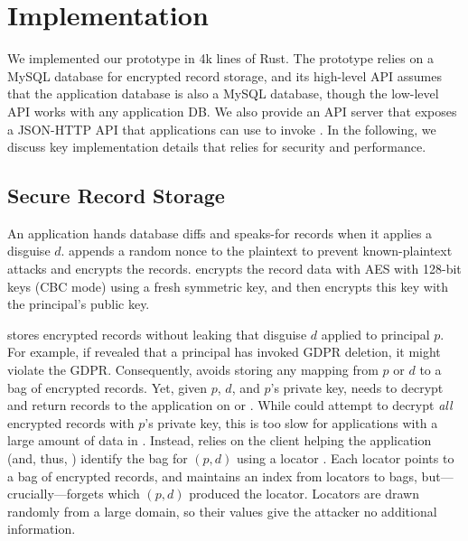 \section{Implementation}
\label{s:impl}

%
We implemented our \sys prototype in 4k lines of Rust.
%
The prototype relies on a MySQL database for encrypted record storage, and
its high-level API assumes that the application database is also a MySQL
database, though the low-level API works with any application DB.
%
We also provide an API server that exposes a JSON-HTTP API that applications
can use to invoke \sys.
%
In the following, we discuss key implementation details that \sys relies for
security and performance.
%

\subsection{Secure Record Storage}
\label{s:impl-locators}
%
An application hands \sys database diffs and speaks-for records when it applies
a disguise $d$.
%
\sys appends a random nonce to the plaintext to prevent known-plaintext attacks
and encrypts the records.
%
\sys encrypts the record data with AES with 128-bit keys (CBC mode) using a fresh symmetric key, and
then encrypts this key with the principal's public key.
%

%
\sys stores encrypted records without leaking that disguise $d$ applied to
principal $p$.
%
For example, if \sys revealed that a principal has invoked GDPR deletion, it
might violate the GDPR.
%
Consequently, \sys avoids storing any mapping from $p$ or $d$ to a bag of
encrypted records.
%
Yet, given $p$, $d$, and $p$'s private key, \sys needs to decrypt and return
records to the application on  or .
%
While \sys could attempt to decrypt \emph{all} encrypted records with $p$'s
private key, this is too slow for applications with a large amount
of data in \sys.
%
Instead, \sys relies on the client helping the application (and, thus, \sys)
identify the bag for $(p, d)$ using a locator .
%
Each locator points to a bag of encrypted records, and \sys maintains an index
from locators to bags, but---crucially---forgets which $(p, d)$ produced the
locator.
%
Locators are drawn randomly from a large domain, so their values give
the attacker no additional information.
%

